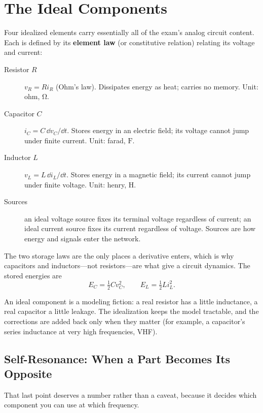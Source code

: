 \section{The Ideal Components}
Four idealized elements carry essentially all of the exam's analog circuit
content. Each is defined by its \textbf{element law} (or constitutive relation)
relating its voltage and current:
\begin{description}
\item[Resistor \(R\)] \(v_R=Ri_R\) (Ohm's law). Dissipates energy as heat;
carries no memory. Unit: ohm, \(\si{\ohm}\).
\item[Capacitor \(C\)] \(i_C=C\,\dd v_C/\dd t\). Stores energy in an electric
field; its voltage cannot jump under finite current. Unit: farad, \(\si{\farad}\).
\item[Inductor \(L\)] \(v_L=L\,\dd i_L/\dd t\). Stores energy in a magnetic
field; its current cannot jump under finite voltage. Unit: henry, \(\si{\henry}\).
\item[Sources] an ideal voltage source fixes its terminal voltage regardless of
current; an ideal current source fixes its current regardless of voltage. Sources
are how energy and signals enter the network.
\end{description}
The two storage laws are the only places a derivative enters, which is why
capacitors and inductors---not resistors---are what give a circuit dynamics. The
stored energies are
\[
E_C=\tfrac{1}{2}Cv_C^2,\qquad
E_L=\tfrac{1}{2}Li_L^2.
\]
\cite[pp.~16--22]{white2004highfrequency}

\begin{physicalbox}
An ideal component is a modeling fiction: a real resistor has a little
inductance, a real capacitor a little leakage. The idealization keeps the model
tractable, and the corrections are added back only when they matter (for example,
a capacitor's series inductance at very high frequencies, VHF).
\cite[pp.~44--45]{white2004highfrequency}
\end{physicalbox}

\subsection{Self-Resonance: When a Part Becomes Its Opposite}
\label{sec:selfresonance}
That last point deserves a number rather than a caveat, because it decides which
component you can use at which frequency.

